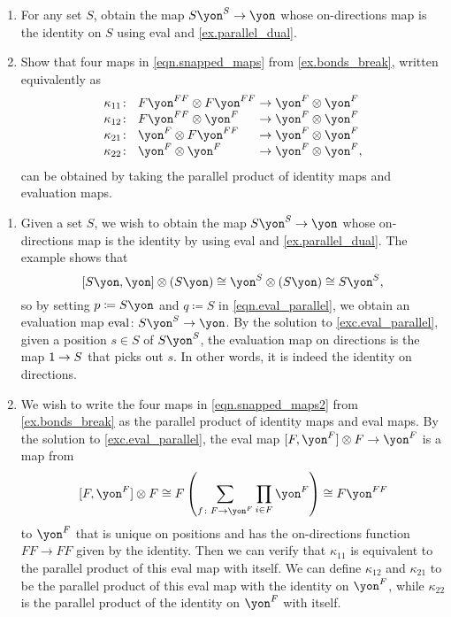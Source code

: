 \documentclass[Book-Poly]{subfiles}
\begin{document}
\begin{exercise}
\begin{enumerate}
	\item For any set $S$, obtain the map $S\yon^S\to\yon$ whose on-directions map is the identity on $S$ using eval and \cref{ex.parallel_dual}.
	\item Show that four maps in \eqref{eqn.snapped_maps} from \cref{ex.bonds_break}, written equivalently as
	\begin{equation} \label{eqn.snapped_maps2}
	\arraycolsep=1.4pt
    \begin{array}{lll}
    	\kappa_{11}\colon&~ F\yon^{FF}\otimes F\yon^{FF}&\to\yon^F\otimes\yon^F\\
    	\kappa_{12}\colon&~ F\yon^{FF}\otimes \yon^F&\to\yon^F\otimes\yon^F\\
    	\kappa_{21}\colon&~ \yon^F\otimes F\yon^{FF}&\to\yon^F\otimes\yon^F\\
    	\kappa_{22}\colon&~ \yon^F\otimes\yon^F&\to\yon^F\otimes\yon^F,
    \end{array}
	\end{equation}
	can be obtained by taking the parallel product of identity maps and evaluation maps.
\qedhere
\end{enumerate}
\begin{solution}
\begin{enumerate}
    \item Given a set $S$, we wish to obtain the map $S\yon^S \to \yon$ whose on-directions map is the identity by using eval and \cref{ex.parallel_dual}.
    The example shows that
    \[
        \ihom{S\yon, \yon} \otimes (S\yon) \iso \yon^S \otimes (S\yon) \iso S\yon^S,
    \]
    so by setting $p \coloneqq S\yon$ and $q \coloneqq S$ in \eqref{eqn.eval_parallel}, we obtain an evaluation map $\fun{eval} \colon S\yon^S \to \yon$.
    By the solution to \cref{exc.eval_parallel}, given a position $s \in S$ of $S\yon^S$, the evaluation map on directions is the map $\textsf{1} \to S$ that picks out $s$.
    In other words, it is indeed the identity on directions.
    \item We wish to write the four maps in \eqref{eqn.snapped_maps2} from \cref{ex.bonds_break} as the parallel product of identity maps and eval maps.
    By the solution to \cref{exc.eval_parallel}, the eval map $\ihom{F,\yon^F}\otimes F\to\yon^F$
    is a map from
    \[
        \ihom{F,\yon^F}\otimes F\iso F\left(\sum_{f\colon F\to\yon^F}\prod_{i\in F}\yon^F\right)\iso F\yon^{FF}
    \]
    to $\yon^F$ that is unique on positions and has the on-directions function $FF\to FF$ given by the identity.
    Then we can verify that $\kappa_{11}$ is equivalent to the parallel product of this eval map with itself.
    We can define $\kappa_{12}$ and $\kappa_{21}$ to be the parallel product of this eval map with the identity on $\yon^F$, while $\kappa_{22}$ is the parallel product of the identity on $\yon^F$ with itself.
\end{enumerate}
\end{solution}
\end{exercise}
\end{document}
